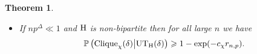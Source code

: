 \documentclass[a4paper,11pt,english,reqno]{amsart}
\numberwithin{equation}{section}
\renewcommand{\leq}{\leqslant}
\renewcommand{\geq}{\geqslant}
\newcommand{\UTH}{\textup{UT}_{\textup{H}}(\delta)}
\renewcommand{\P}{\mathbb{P}}
\newcommand{\tu}[1]{\textup{#1}}
\newtheorem{theorem}{Theorem}[section]
\newcommand{\cyan}[1]{{\color{cyan} #1}}
\begin{document}
\begin{theorem}
\begin{itemize}
			
			\item[(b)] If $np^{\Delta}\ll 1$ and $\tu{H}$ is non-bipartite then for all large $n$ we have
			\begin{equation*}
				 \P\left( \tu{Clique}_{\chi}(\delta)\big| \UTH\right) \geq 1 - \exp(-c_\chi r_{n,p}).
			\end{equation*}
			
		\end{itemize}
		
		
	\end{theorem}
	
\end{document}
